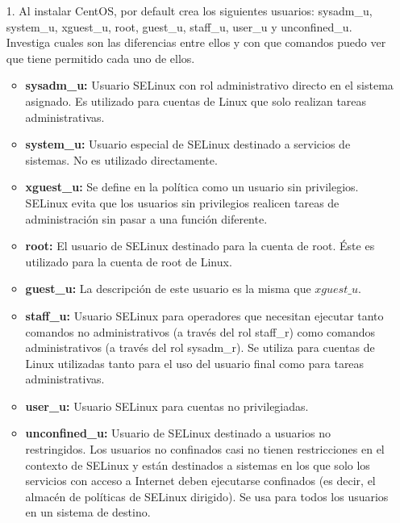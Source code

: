 \documentclass[a4paper, 11pt, oneside]{article}
\begin{document}
\begin{enumerate}
    \item[1.] Al instalar CentOS, por default crea los siguientes usuarios: sysadm\_u, system\_u,
    xguest\_u, root, guest\_u, staff\_u, user\_u y unconfined\_u. Investiga cuales son las
    diferencias entre ellos y con que comandos puedo ver que tiene permitido cada uno de
    ellos.
    \begin{itemize}
        \item \textbf{sysadm\_u:} Usuario SELinux con rol administrativo directo en el sistema asignado. Es utilizado para cuentas de Linux que solo realizan tareas administrativas.
        
        \item \textbf{system\_u:} Usuario especial de SELinux destinado a servicios de sistemas. No es utilizado directamente.
        
        \item \textbf{xguest\_u:} Se define en la política como un usuario sin privilegios. SELinux evita que los usuarios sin privilegios realicen tareas de administración sin pasar a una función diferente.

        \item \textbf{root:} El usuario de SELinux destinado para la cuenta de root. Éste es utilizado para la cuenta de root de Linux.
        
        \item \textbf{guest\_u:} La descripción de este usuario es la misma que $xguest\_u$.
        
        \item \textbf{staff\_u:} Usuario SELinux para operadores que necesitan ejecutar tanto comandos no administrativos (a través del rol staff\_r) como comandos administrativos (a través del rol sysadm\_r). Se utiliza para cuentas de Linux utilizadas tanto para el uso del usuario final como para tareas administrativas.
        
        \item \textbf{user\_u:} Usuario SELinux para cuentas no privilegiadas.
        
        \item \textbf{unconfined\_u:} Usuario de SELinux destinado a usuarios no restringidos. Los usuarios no confinados casi no tienen restricciones en el contexto de SELinux y están destinados a sistemas en los que solo los servicios con acceso a Internet deben ejecutarse confinados (es decir, el almacén de políticas de SELinux dirigido). Se usa para todos los usuarios en un sistema de destino.


\end{itemize}
\end{enumerate}
\end{document}
